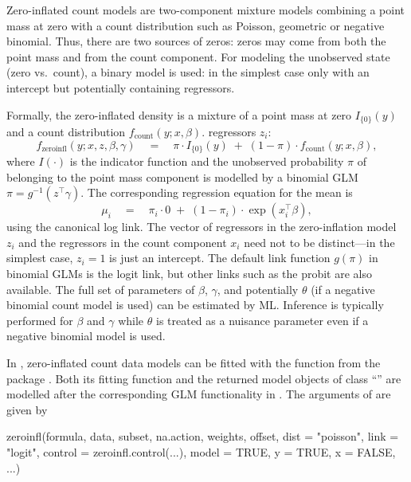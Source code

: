\documentclass{Z}
\newcommand{\class}[1]{``\code{#1}''}
\newcommand{\fct}[1]{\code{#1()}}
\begin{document}
Zero-inflated count models are two-component mixture models
combining a point mass at zero with a count distribution such as
Poisson, geometric or negative binomial. Thus, there are two
sources of zeros: zeros may come from both the point mass and
from the count component. For modeling the unobserved state
(zero vs.\ count), a binary model is used: in the simplest case
only with an intercept but potentially containing regressors.

Formally, the zero-inflated density is a mixture of a point mass
at zero $I_{\{0\}}(y)$ and a count distribution $f_\mathrm{count}(y; x, \beta)$.
regressors $z_i$:
\begin{equation} \label{eq:zeroinfl}
f_\mathrm{zeroinfl}(y; x, z, \beta, \gamma) \quad = \quad
  \pi \cdot I_{\{0\}}(y) \; + \; (1 - \pi) \cdot f_\mathrm{count}(y; x, \beta),
\end{equation}
where $I(\cdot)$ is the indicator function and the unobserved probability $\pi$
of belonging to the point mass component is modelled by a binomial GLM
$\pi =  g^{-1}(z^\top \gamma)$.
The corresponding regression equation for the mean is
\begin{equation} \label{eq:zeroinfl-mean}
\mu_i \quad = \quad \pi_i \cdot 0 \; + \; (1 - \pi_i) \cdot \exp(x_i^\top \beta),
\end{equation}
using the canonical log link.
The vector of regressors in the zero-inflation model $z_i$
and the regressors in the count component $x_i$ need not to be distinct---in
the simplest case, $z_i = 1$ is just
an intercept. The default link function $g(\pi)$ in binomial GLMs is the
logit link, but other links such as the probit are also available. The full
set of parameters of $\beta$, $\gamma$, and potentially $\theta$ (if 
a negative binomial count model is used) can be estimated by ML. Inference
is typically performed for $\beta$ and $\gamma$ while $\theta$ is treated
as a nuisance parameter even if a negative binomial model is used.

In , zero-inflated count data models can be fitted with the
\fct{zeroinfl} function from the  package \citep{countreg:Jackman:2007}.
Both its fitting function and the returned model objects of class \class{zeroinfl}
are modelled after the corresponding GLM functionality in . The
arguments of \fct{zeroinfl} are given by

\begin{Soutput}
zeroinfl(formula, data, subset, na.action, weights, offset,
  dist = "poisson", link = "logit", control = zeroinfl.control(...),
  model = TRUE, y = TRUE, x = FALSE, ...)
\end{Soutput}
\end{document}
